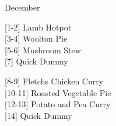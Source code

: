 		\begin{menu}{December}
    
    \begin{recipelist}
    
        {\scriptsize[1-2]} Lamb Hotpot\\
        {\scriptsize[3-4]} Woolton Pie\\
        {\scriptsize[5-6]} Mushroom Stew\\
        {\scriptsize[7]} Quick Dummy\\%
    \end{recipelist}%
    \begin{recipelist}
    
        {\scriptsize[8-9]} Fletchs Chicken Curry\\
        {\scriptsize[10-11]} Roasted Vegetable Pie\\
        {\scriptsize[12-13]} Potato and Pea Curry\\
        {\scriptsize[14]} Quick Dummy\\%
    \end{recipelist}\par%
  

\end{menu}
